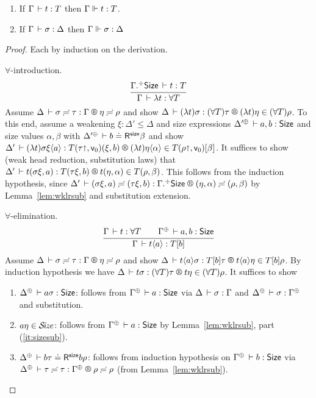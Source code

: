 \documentclass[acmlarge,review,anonymous]{acmart}\settopmatter{printfolios=true}
\begin{document}
\begin{theorem}
\label{thm:fundty}
\bla
\begin{enumerate}
\item
If $\Gamma \,\vdash t : T$ then $\Gamma \Vdash t : T$.
\item
If $\Gamma \,\vdash \sigma : \Delta$ then
$\Gamma \Vdash \sigma : \Delta$
\end{enumerate}
\end{theorem}
\begin{proof}
Each by induction on the derivation.

\begin{caselist}

\nextcase $\forall$-introduction.
\[
  \ru{\erext \Gamma \Size \der t : T
    }{\Gamma \der \lambda t : \forall T}
\]
Assume $\LRSub {\Delta} {\sigma} {\tau} \Gamma {\eta} {\rho}$ and show
$\LR \Delta {(\lambda t)\sigma} {(\forall T)\tau} {(\lambda t)\eta} {(\forall T)\rho}$.
To this end, assume a weakening $\xi : \Delta' \leq \Delta$ and
size expressions %
$\resurrect{\Delta'} \der a, b : \Size$ and size values $\alpha,\beta$ with
$\LRSize {\resurrect{\Delta'}} b \beta$ and show
$\LR {\Delta'} {(\lambda t)\sigma\xi \ann a} {T(\tau \slift, \ind 0)(\xi,b)} {(\lambda t)\eta \ann \alpha} {T(\rho\slift, \ind 0)[\beta]}$.
It suffices to show (weak head reduction, substitution laws) that
$\LR {\Delta'} {t(\sigma\xi,a)} {T(\tau\xi,b)} {t(\eta,\alpha)} {T(\rho,\beta)}$.
This follows from the induction hypothesis, since
$\LRSub {\Delta'} {(\sigma\xi,a)} {(\tau\xi,b)} {\erext \Gamma \Size} {(\eta,\alpha)} {(\rho,\beta)}$
by Lemma~\ref{lem:wklrsub} and substitution extension.

\nextcase $\forall$-elimination.
\[
  \ru{\Gamma \der t : \forall T \qquad %
      \resurrect \Gamma \der a,b : \Size
    }{\Gamma \der t \ann a : T[b]}
\]
Assume $\LRSub {\Delta} {\sigma} {\tau} \Gamma {\eta} {\rho}$ and show
$\LR \Delta {t \ann a \sigma} {T[b]\tau} {t \ann a \eta} {T[b]\rho}$.
By induction hypothesis we have $\LR \Delta {t \sigma} {(\forall T)\tau} {t \eta} {(\forall T) \rho}$.
It suffices to show
\begin{enumerate}
\item $\resurrect\Delta \der a\sigma : \Size$: follows from $\resurrect\Gamma \der a : \Size$
  via $\Delta \,\vdash \sigma : \Gamma$ and $\resurrect\Delta \der \sigma : \resurrect\Gamma$
  and substitution.
\item $a\eta \in \mathcal{S}\!\mathit{ize}$: follows from $\resurrect\Gamma \der a : \Size$
  by Lemma~\ref{lem:wklrsub}, part (\ref{it:sizesub}).
\item $\LRSize {\resurrect \Delta} {b\tau} {b\rho}$: follows from induction hypothesis on $\resurrect \Gamma \der b : \Size$ via $\LRSub {\resurrect \Delta} \tau \tau {\resurrect\Gamma} \rho \rho$ (from Lemma~\ref{lem:wklrsub}).
\end{enumerate}

\end{caselist}
\end{proof}
\end{document}
